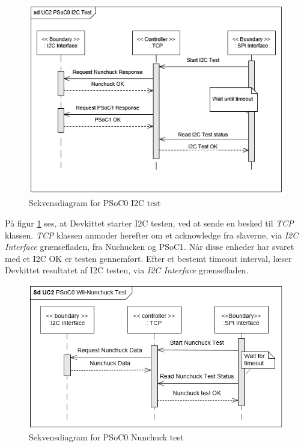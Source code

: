 \begin{figure}[H]
	\centering
	\includegraphics[width=\textwidth] {Systemarkitektur/images/SDPSoC0I2CTest}
	\caption{Sekvensdiagram for PSoC0 I2C test}
	\label{fig:sekvensPSoC0I2CTest}
\end{figure}

På figur \ref{fig:sekvensPSoC0I2CTest} ses, at Devkittet starter I2C testen, ved at sende en besked til \textit{TCP} klassen. \textit{TCP} klassen anmoder herefter om et acknowledge fra slaverne, via \textit{I2C Interface} grænsefladen, fra Nuchucken og PSoC1. Når disse enheder har svaret med et I2C OK er testen gennemført. Efter et bestemt timeout interval, læser Devkittet resultatet af I2C testen, via \textit{I2C Interface} grænsefladen.

\begin{figure}[H]
	\centering
	\includegraphics[width=\textwidth] {Systemarkitektur/images/SDPSoC0NunchuckTest}
	\caption{Sekvensdiagram for PSoC0 Nunchuck test}
	\label{fig:sekvensPSoC0NunchuckTest}
\end{figure}

